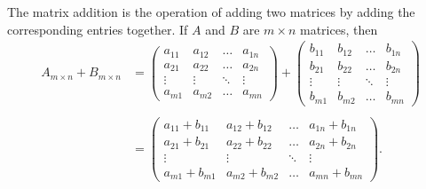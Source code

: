 \documentclass{subfile}
\begin{document}
	\begin{definition}
		The matrix addition is the operation of adding two matrices by adding the corresponding entries together. If $A$ and $B$ are $m \times n$ matrices, then
		\begin{align*}
	{A_{m \times n}} + {B_{m \times n}} &= \begin{pmatrix}
		{{a_{11}}}&{{a_{12}}}& \ldots &{{a_{1n}}}\\
		{{a_{21}}}&{{a_{22}}}& \ldots &{{a_{2n}}}\\
		\vdots & \vdots & \ddots & \vdots \\
		{{a_{m1}}}&{{a_{m2}}}& \ldots &{{a_{mn}}}
		\end{pmatrix} + \begin{pmatrix}
		{{b_{11}}}&{{b_{12}}}& \ldots &{{b_{1n}}}\\
		{{b_{21}}}&{{b_{22}}}& \ldots &{{b_{2n}}}\\
		\vdots & \vdots & \ddots & \vdots \\
		{{b_{m1}}}&{{b_{m2}}}& \ldots &{{b_{mn}}}
		\end{pmatrix}\\
	\\
	&= \begin{pmatrix}
		{{a_{11}} + {b_{11}}}&{{a_{12}} + {b_{12}}}& \ldots &{{a_{1n}} + {b_{1n}}}\\
		{{a_{21}} + {b_{21}}}&{{a_{22}} + {b_{22}}}& \ldots &{{a_{2n}} + {b_{2n}}}\\
		\vdots & \vdots & \ddots & \vdots \\
		{{a_{m1}} + {b_{m1}}}&{{a_{m2}} + {b_{m2}}}& \ldots &{{a_{mn}} + {b_{mn}}}
		\end{pmatrix}.
		\end{align*}
		
		
	\end{definition}
	
	
\end{document}
